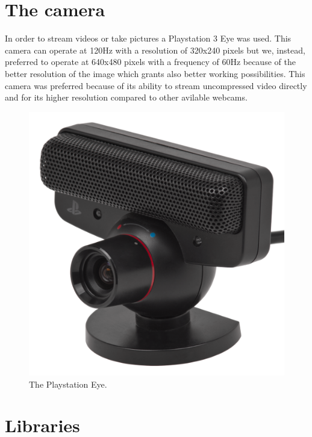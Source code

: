 \section{The camera}
In order to stream videos or take pictures a Playstation 3 Eye was used.
This camera can operate at 120Hz with a resolution of 320x240 pixels but we, instead, preferred to operate at 640x480 pixels with a frequency of 60Hz because of the better resolution of the image which grants also better working possibilities. 
This camera was preferred because of its ability to stream uncompressed video directly \cite{pseyecompr} and for its higher resolution compared to other avilable webcams.

\begin{figure}[hbt]
    \centering
    \includegraphics[scale=0.5]{img/pseye.png}
    \caption{The Playstation Eye.}
\end{figure}
 
\newpage
\section{Libraries}

